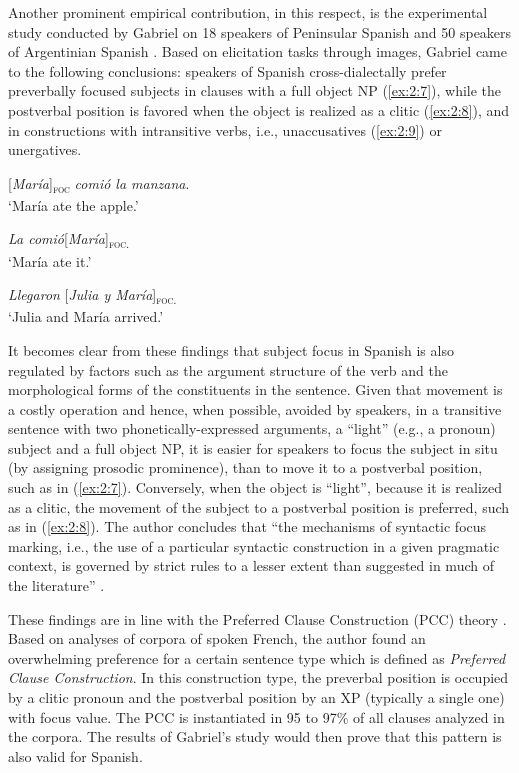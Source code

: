 Another prominent empirical contribution, in this respect, is the experimental study conducted by Gabriel on 18 speakers of Peninsular Spanish \parencite{gabriel2007fokus} and 50 speakers of Argentinian Spanish \parencite{gabriel2010focus}. Based on elicitation tasks through images, Gabriel came to the following conclusions: speakers  of  Spanish  cross-dialectally prefer  preverbally focused subjects  in  clauses  with  a  full  object NP (\ref{ex:2:7}), while  the postverbal position is favored when the object is realized as a clitic (\ref{ex:2:8}), and in constructions with intransitive verbs, i.e., unaccusatives (\ref{ex:2:9}) or unergatives.

 \ea \label{ex:2:7}
{[\textit{María}]\textsubscript{\textsc{foc}}} \normalsize \textit{comió la manzana}.\\
`María ate the apple.'

\z

 \ea \label{ex:2:8}
\textit{La comió}{[\textit{María}]\textsubscript{\textsc{foc.}}}\normalsize\\
`María ate it.'

\z

 \ea \label{ex:2:9}
 \textit{ Llegaron} {[\textit{Julia y María}]\textsubscript{\textsc{foc.}}}\normalsize\\
`Julia and María arrived.'\\

\z


It becomes clear from these findings that subject focus in Spanish is also regulated by factors such as the argument structure of the verb and the morphological forms of the constituents in the sentence. Given that movement is a costly operation \parencite{chomsky1991linguistics} and hence, when possible, avoided by speakers, in a transitive sentence with two phonetically-expressed arguments, a “light” (e.g., a pronoun) subject and a full object NP, it is easier for speakers to focus the subject in situ (by assigning prosodic prominence), than to move it to a postverbal position, such as in (\ref{ex:2:7}). Conversely, when the object is “light”, because it is realized as a clitic, the movement of the subject to a postverbal position is preferred, such as in (\ref{ex:2:8}). The author concludes that ``the mechanisms of syntactic focus marking, i.e., the use of a particular syntactic construction in a given pragmatic context, is governed by strict rules to a lesser extent than suggested in much of the literature” \parencite[189]{gabriel2010focus}.

These findings are in line with the Preferred Clause Construction (PCC) theory \parencite{lambrecht2010constraints}. Based on analyses of corpora of spoken French, the author found an overwhelming preference for a certain sentence type which is defined as \textit{Preferred Clause Construction}. In  this construction type,  the  preverbal  position is occupied  by a clitic pronoun and the postverbal position by an XP (typically a single one) with focus value. The PCC is instantiated in 95 to 97\% of all clauses analyzed in the corpora. The results of Gabriel’s study would then prove that this pattern is also valid for Spanish.

